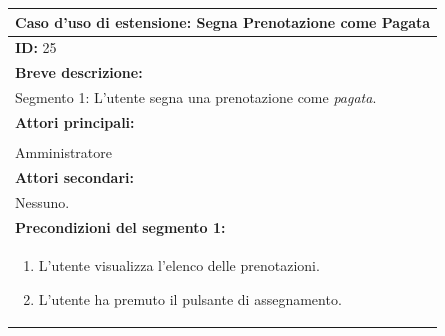 \documentclass{article}
\begin{document}
                \begin{table}[H]
                    \begin{tabular}{|p{\linewidth}|}
                        \hline
                        \cellcolor{gray!100}
                        \color{white}
                        \centerline{\textbf{Caso d'uso di estensione:} Segna Prenotazione come Pagata} \\
                        \hline
                        \textbf{ID:} 25 \\
                        \hline
                        \cellcolor{gray!20}
                        \textbf{Breve descrizione:} \\
                        \cellcolor{gray!20}
                        Segmento 1: L'utente segna una prenotazione come \emph{pagata}. \\
                        \hline
                        \textbf{Attori principali:} \\
                        \begin{minipage}{\linewidth}
                            Biglietteria \\
                            Amministratore
                        \end{minipage}
                        \vspace{-5pt} \\
                        \hline
                        \textbf{Attori secondari:} \\
                        Nessuno. \\
                        \hline
                        \cellcolor{gray!20}
                        \textbf{Precondizioni del segmento 1:} \\
                        \cellcolor{gray!20}
                        \begin{minipage}{\linewidth}
                            \begin{enumerate}
                                \item L'utente visualizza l'elenco delle prenotazioni.
                                \item L'utente ha premuto il pulsante di assegnamento.
                            \end{enumerate}
                        \end{minipage}
                        \vspace{-5pt} \\

\end{tabular}
\end{table}
\end{document}
